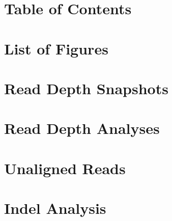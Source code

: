 \documentclass[12pt]{article}
\begin{document}
	

	\section{Table of Contents}
	\tableofcontents
	\newpage 

	\section{List of Figures}
	\listoffigures
	\newpage

	\listoftables
	\newpage

	\section{Read Depth Snapshots}
	
	\newpage

	\section{Read Depth Analyses}
	
	\newpage

%	

	\section{Unaligned Reads}	
	
	\newpage

	\section{Indel Analysis}
	
	\newpage

	
	
	
\end{document}
